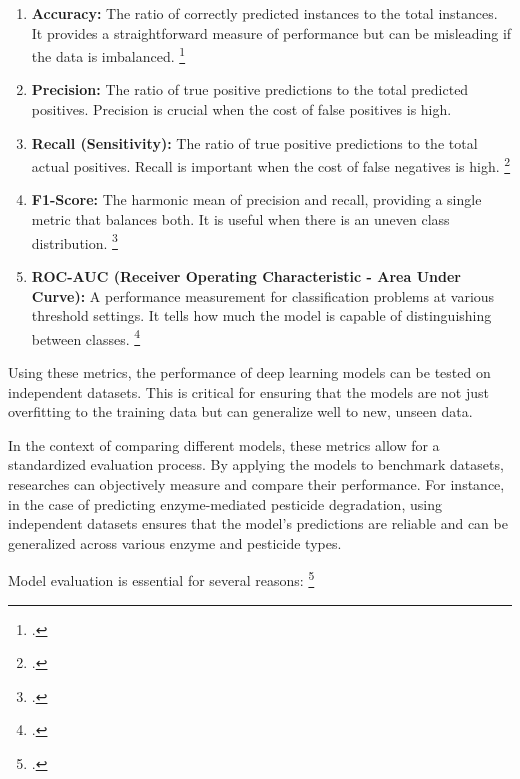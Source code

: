 \begin{enumerate}
    \item \textbf{Accuracy:} The ratio of correctly predicted instances to the total instances. It provides a straightforward measure of performance but can be misleading if the data is imbalanced. \footcite{AccuracyPrecision2024}
    \item \textbf{Precision:} The ratio of true positive predictions to the total predicted positives. Precision is crucial when the cost of false positives is high.
    \item \textbf{Recall (Sensitivity):} The ratio of true positive predictions to the total actual positives. Recall is important when the cost of false negatives is high. \footcite{PrecisionRecall2024}
    \item \textbf{F1-Score:} The harmonic mean of precision and recall, providing a single metric that balances both. It is useful when there is an uneven class distribution. \footcite{Fscore2024}
    \item \textbf{ROC-AUC (Receiver Operating Characteristic - Area Under Curve):} A performance measurement for classification problems at various threshold settings. It tells how much the model is capable of distinguishing between classes. \footcite{ReceiverOperatingCharacteristic2024}
\end{enumerate}

Using these metrics, the performance of deep learning models can be tested on independent datasets. This is critical for ensuring that the models are not just overfitting to the training data but can generalize well to new, unseen data.

In the context of comparing different models, these metrics allow for a standardized evaluation process. By applying the models to benchmark datasets, researches can objectively measure and compare their performance. For instance, in the case of predicting enzyme-mediated pesticide degradation, using independent datasets ensures that the model’s predictions are reliable and can be generalized across various enzyme and pesticide types.

Model evaluation is essential for several reasons: \footcite{emmert-streibIntroductoryReviewDeep2020}

